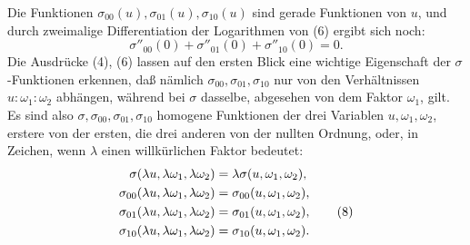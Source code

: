\documentclass[11pt]{article}
\begin{document}
Die Funktionen $\sigma_{00}(u),\sigma_{01}(u),\sigma_{10}(u)$ sind gerade Funktionen von $u$, und durch zweimalige Differentiation der Logarithmen von (6) ergibt sich noch:
\begin{equation}
\sigma''_{00}(0)+\sigma''_{01}(0)+\sigma''_{10}(0)=0. \tag{7}
\end{equation}
Die Ausdrücke (4), (6) lassen auf den ersten Blick eine wichtige Eigenschaft der $\sigma$-Funktionen erkennen, daß nämlich $\sigma_{00},\sigma_{01},\sigma_{10}$ nur von den Verhältnissen $u:\omega_1:\omega_2$ abhängen, während bei $\sigma$ dasselbe, abgesehen von dem Faktor $\omega_1$, gilt. Es sind also $\sigma,\sigma_{00},\sigma_{01},\sigma_{10}$ homogene Funktionen der drei Variablen $u,
\omega_1,
\omega_2$, erstere von der ersten, die drei anderen von der nullten Ordnung, oder, in Zeichen, wenn $\lambda$ einen willkürlichen Faktor bedeutet:
\begin{align}
\sigma(\lambda u,\lambda\omega_1,\lambda\omega_2)&=\lambda\sigma(u,
\omega_1,
\omega_2),\notag\\
\sigma_{00}(\lambda u,\lambda\omega_1,\lambda\omega_2)&=\sigma_{00}(u,
\omega_1,
\omega_2),\notag\\
\sigma_{01}(\lambda u,\lambda\omega_1,\lambda\omega_2)&=\sigma_{01}(u,
\omega_1,
\omega_2), \tag{8}\\
\sigma_{10}(\lambda u,\lambda\omega_1,\lambda\omega_2)&=\sigma_{10}(u,
\omega_1,
\omega_2).\notag
\end{align}
\end{document}
